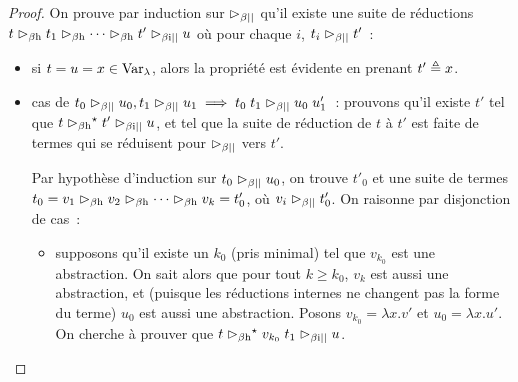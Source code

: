 \begin{proof}
  On prouve par induction sur $\redPar$ qu'il existe une suite de réductions
  $t \Hred t_1 \Hred\cdots\Hred t'\IredPar u$ où pour chaque
  $i$, $t_i \redPar t'$~:
  \begin{itemize}
  \item si $t = u = x \in \lamVar$, alors la propriété est évidente en prenant
    $t' \defeq x$.
  \item cas de
    $t_0 \redPar u_0, t_1 \redPar u_1 \implies t_0\;t_1\redPar u_0\;u'_1$~:
    prouvons qu'il existe $t'$ tel que $t \Hred^\star t' \IredPar u$, et tel
    que la suite de réduction de $t$ à $t'$ est faite de termes qui se réduisent
    pour $\redPar$ vers $t'$.
    
    Par hypothèse d'induction sur $t_0 \redPar u_0$, on trouve $t'_0$ et une
    suite de termes $t_0 = v_1\Hred v_2\Hred \cdots \Hred v_k = t'_0$, où
    $v_i \redPar t'_0$. On raisonne par disjonction de cas~:
    \begin{itemize}
    \item supposons qu'il existe un $k_0$ (pris minimal) tel que $v_{k_0}$ est
      une abstraction. On sait alors que pour tout $k \geq k_0$, $v_k$ est
      aussi une abstraction, et (puisque les réductions internes ne changent pas
      la forme du terme) $u_0$ est aussi une abstraction.
      Posons $v_{k_0} = \lambda x.v'$ et $u_0 = \lambda x.u'$. On cherche
      à prouver que $t \Hred^\star v_{k_0}\;t_1 \IredPar u$.


\end{itemize}
\end{itemize}
\end{proof}
